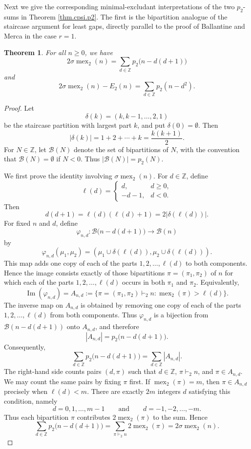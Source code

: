 \documentclass[12pt]{amsart}
\newtheorem{theorem}{Theorem}[section]
\theoremstyle{definition}
\theoremstyle{remark}
\numberwithin{equation}{section}
\newcommand{\mex}{\operatorname{mex}}
\begin{document}
Next we give the corresponding minimal-excludant interpretations of the two $p_2$-sums in Theorem \ref{thm.cpsi.p2}.  The first is the bipartition analogue of the staircase argument for least gaps, directly parallel to the proof of Ballantine and Merca \cite[Theorem 1.1]{BallantineMerca} in the case $r=1$.

\begin{theorem}\label{thm.sigma.p2}
For all $n\geq 0$, we have
\[
2\sigma\mex_2(n)=\sum_{d\in\mathbb Z}p_2\bigl(n-d(d+1)\bigr)
\]
and
\[
2\sigma\mex_2(n)-E_2(n)=\sum_{d\in\mathbb Z}p_2(n-d^2).
\]
\end{theorem}

\begin{proof}
Let
\[
\delta(k)=(k,k-1,\ldots,2,1)
\]
be the staircase partition with largest part $k$, and put $\delta(0)=\emptyset$.  Then
\[
|\delta(k)|=1+2+\cdots+k=\frac{k(k+1)}2.
\]
For $N\in\mathbb Z$, let $\mathcal B(N)$ denote the set of bipartitions of $N$, with the convention that $\mathcal B(N)=\emptyset$ if $N<0$.  Thus $|\mathcal B(N)|=p_2(N)$.

We first prove the identity involving $\sigma\mex_2(n)$.  For $d\in\mathbb Z$, define
\[
\ell(d)=
\begin{cases}
d,&d\geq 0,\\
-d-1,&d<0.
\end{cases}
\]
Then
\[
d(d+1)=\ell(d)(\ell(d)+1)=2|\delta(\ell(d))|.
\]
For fixed $n$ and $d$, define
\[
\varphi_{n,d}:\mathcal B\bigl(n-d(d+1)\bigr)\longrightarrow \mathcal B(n)
\]
by
\[
\varphi_{n,d}(\mu_1,\mu_2)=
(\mu_1\cup\delta(\ell(d)),\mu_2\cup\delta(\ell(d))).
\]
This map adds one copy of each of the parts $1,2,\ldots,\ell(d)$ to both components.  Hence the image consists exactly of those bipartitions $\pi=(\pi_1,\pi_2)$ of $n$ for which each of the parts $1,2,\ldots,\ell(d)$ occurs in both $\pi_1$ and $\pi_2$.  Equivalently,
\[
\operatorname{Im}(\varphi_{n,d})
=A_{n,d}:=
\{\pi=(\pi_1,\pi_2)\vdash_2 n: \mex_2(\pi)>\ell(d)\}.
\]
The inverse map on $A_{n,d}$ is obtained by removing one copy of each of the parts $1,2,\ldots,\ell(d)$ from both components.  Thus $\varphi_{n,d}$ is a bijection from $\mathcal B(n-d(d+1))$ onto $A_{n,d}$, and therefore
\[
|A_{n,d}|=p_2\bigl(n-d(d+1)\bigr).
\]
Consequently,
\[
\sum_{d\in\mathbb Z}p_2\bigl(n-d(d+1)\bigr)
=
\sum_{d\in\mathbb Z}|A_{n,d}|.
\]
The right-hand side counts pairs $(d,\pi)$ such that $d\in\mathbb Z$, $\pi\vdash_2 n$, and $\pi\in A_{n,d}$.  We may count the same pairs by fixing $\pi$ first.  If $\mex_2(\pi)=m$, then $\pi\in A_{n,d}$ precisely when $\ell(d)<m$.  There are exactly $2m$ integers $d$ satisfying this condition, namely
\[
d=0,1,\ldots,m-1
\qquad\text{and}\qquad
 d=-1,-2,\ldots,-m.
\]
Thus each bipartition $\pi$ contributes $2\mex_2(\pi)$ to the sum.  Hence
\[
\sum_{d\in\mathbb Z}p_2\bigl(n-d(d+1)\bigr)
=
\sum_{\pi\vdash_2 n}2\mex_2(\pi)
=
2\sigma\mex_2(n).
\]


\end{proof}
\end{document}
